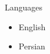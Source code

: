 \documentclass{resume} %
\begin{document}
\begin{rSection}{Languages}
	
	\begin{itemize}
		\item English
		\item Persian 
	\end{itemize}
	
\end{rSection}







\end{document}
